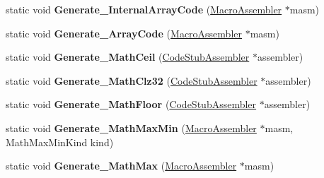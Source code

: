 \begin{DoxyCompactItemize}
\item 
static void {\bfseries Generate\+\_\+\+Internal\+Array\+Code} (\hyperlink{classv8_1_1internal_1_1_macro_assembler}{Macro\+Assembler} $\ast$masm)\hypertarget{classv8_1_1internal_1_1_builtins_a0e1d2a84f1e9c9911cc5e820eb8f0bf1}{}\label{classv8_1_1internal_1_1_builtins_a0e1d2a84f1e9c9911cc5e820eb8f0bf1}

\item 
static void {\bfseries Generate\+\_\+\+Array\+Code} (\hyperlink{classv8_1_1internal_1_1_macro_assembler}{Macro\+Assembler} $\ast$masm)\hypertarget{classv8_1_1internal_1_1_builtins_ab15382bc2737d1b94ade293e8d999510}{}\label{classv8_1_1internal_1_1_builtins_ab15382bc2737d1b94ade293e8d999510}

\item 
static void {\bfseries Generate\+\_\+\+Math\+Ceil} (\hyperlink{classv8_1_1internal_1_1_code_stub_assembler}{Code\+Stub\+Assembler} $\ast$assembler)\hypertarget{classv8_1_1internal_1_1_builtins_ac65544c54f0854f030a1172d3ab84f90}{}\label{classv8_1_1internal_1_1_builtins_ac65544c54f0854f030a1172d3ab84f90}

\item 
static void {\bfseries Generate\+\_\+\+Math\+Clz32} (\hyperlink{classv8_1_1internal_1_1_code_stub_assembler}{Code\+Stub\+Assembler} $\ast$assembler)\hypertarget{classv8_1_1internal_1_1_builtins_a9ff519e92aaf5280dac43676c882c134}{}\label{classv8_1_1internal_1_1_builtins_a9ff519e92aaf5280dac43676c882c134}

\item 
static void {\bfseries Generate\+\_\+\+Math\+Floor} (\hyperlink{classv8_1_1internal_1_1_code_stub_assembler}{Code\+Stub\+Assembler} $\ast$assembler)\hypertarget{classv8_1_1internal_1_1_builtins_ae88407688588e04b5a2b30c14ccee1f4}{}\label{classv8_1_1internal_1_1_builtins_ae88407688588e04b5a2b30c14ccee1f4}

\item 
static void {\bfseries Generate\+\_\+\+Math\+Max\+Min} (\hyperlink{classv8_1_1internal_1_1_macro_assembler}{Macro\+Assembler} $\ast$masm, Math\+Max\+Min\+Kind kind)\hypertarget{classv8_1_1internal_1_1_builtins_a3651bde50b20fd234cb2124239977ba7}{}\label{classv8_1_1internal_1_1_builtins_a3651bde50b20fd234cb2124239977ba7}

\item 
static void {\bfseries Generate\+\_\+\+Math\+Max} (\hyperlink{classv8_1_1internal_1_1_macro_assembler}{Macro\+Assembler} $\ast$masm)\hypertarget{classv8_1_1internal_1_1_builtins_a638ac2947a64b778738417989cc1b52f}{}\label{classv8_1_1internal_1_1_builtins_a638ac2947a64b778738417989cc1b52f}


\end{DoxyCompactItemize}
